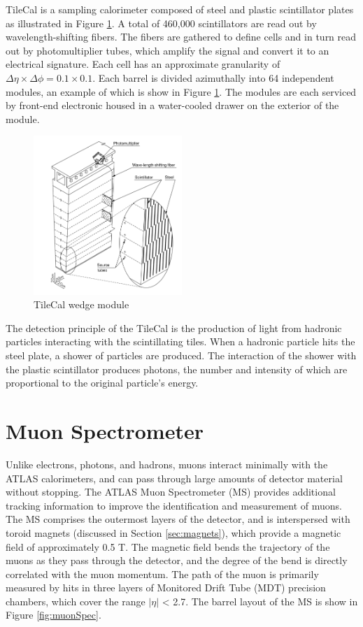 TileCal is a sampling calorimeter composed of steel and plastic scintillator plates as illustrated in Figure \ref{fig:tileCal}. A total of 460,000 scintillators are read out by wavelength-shifting fibers. The fibers are gathered to define cells and in turn read out by photomultiplier tubes, which amplify the signal and convert it to an electrical signature. Each cell has an approximate granularity of $\Delta\eta \times \Delta\phi = 0.1 \times 0.1$. Each barrel is divided azimuthally into 64 independent modules, an example of which is show in Figure \ref{fig:tileCal}. The modules are each serviced by front-end electronic housed in a water-cooled drawer on the exterior of the module. \par

\begin{figure}
        \centering
	\includegraphics[width=0.5\textwidth]{figures/ch4/tileWedge.png}
	\caption{TileCal wedge module \cite{tile_tdr} }
	\label{fig:tileCal}
\end{figure}

The detection principle of the TileCal is the production of light from hadronic particles interacting with the scintillating tiles. When a hadronic particle hits the steel plate, a shower of particles are produced. The interaction of the shower with the plastic scintillator produces photons, the number and intensity of which are proportional to the original particle's energy. \\

\section{Muon Spectrometer}
Unlike electrons, photons, and hadrons, muons interact minimally with the ATLAS calorimeters, and can pass through large amounts of detector material without stopping. The ATLAS Muon Spectrometer (MS) provides additional tracking information to improve the identification and measurement of muons. The MS comprises the outermost layers of the detector, and is interspersed with toroid magnets (discussed in Section \ref{sec:magnets}), which provide a magnetic field of approximately 0.5 T. The magnetic field bends the trajectory of the muons as they pass through the detector, and the degree of the bend is directly correlated with the muon momentum. The path of the muon is primarily measured by hits in three layers of Monitored Drift Tube (MDT) precision chambers, which cover the range $|\eta|$ < 2.7. The barrel layout of the MS is show in Figure \ref{fig:muonSpec}. \par

